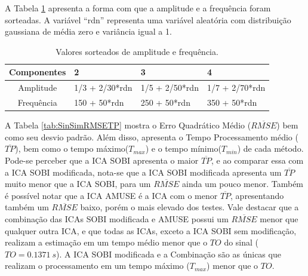 \documentclass[a4paper,12pt]{monografia}
\theoremstyle{plain}
\theoremstyle{definition}
\theoremstyle{remark}
\begin{document}
A  Tabela \ref{tab:sorteio} apresenta a forma com que a amplitude e a frequência foram sorteadas. A variável ``rdn'' representa uma variável aleatória com distribuição gaussiana de média zero e variância igual a 1.  

\begin{table}[h]
    \begin{center}
    \caption{Valores sorteados de amplitude e frequência.}
        \begin{tabular}{c|l|l| l}
        \hline
        Componentes & 2 & 3 & 4\\ \hline
        Amplitude   & 1/3 + 2/30*rdn & 1/5 + 2/50*rdn & 1/7 + 2/70*rdn\\ \hline
        Frequência  & 150 + 50*rdn & 250 + 50*rdn & 350 + 50*rdn \\ \hline
        \end{tabular}
        \label{tab:sorteio}
    \end{center}
    
\end{table}

A Tabela \ref{tab:SinSimRMSETP} mostra o Erro Quadrático Médio ($\overline{RMSE}$) bem como seu desvio padrão. Além disso, apresenta o Tempo Processamento médio ($\overline{TP}$), bem como o tempo máximo($T_{max}$) e o tempo mínimo($T_{min}$) de cada método. Pode-se perceber que a ICA SOBI apresenta o maior $\overline{TP}$, e ao comparar essa com a ICA SOBI modificada, nota-se que a ICA SOBI modificada apresenta um $\overline{TP}$ muito menor que a ICA SOBI, para um $\overline{RMSE}$ ainda um pouco menor. Também é possível notar que a ICA AMUSE é a ICA com o menor $\overline{TP}$, apresentando também um $\overline{RMSE}$ baixo, porém o mais elevado dos testes. Vale destacar que a combinação das ICAs SOBI modificada e AMUSE possui um $\overline{RMSE}$ menor que qualquer outra ICA, e que todas as ICAs, exceto a ICA SOBI sem modificação, realizam a estimação em um tempo médio menor que o $TO$ do sinal ($TO=0.1371~s$). A ICA SOBI modificada e a Combinação são as únicas que realizam o processamento em um tempo máximo ($T_{max}$) menor que o $TO$.
\end{document}

